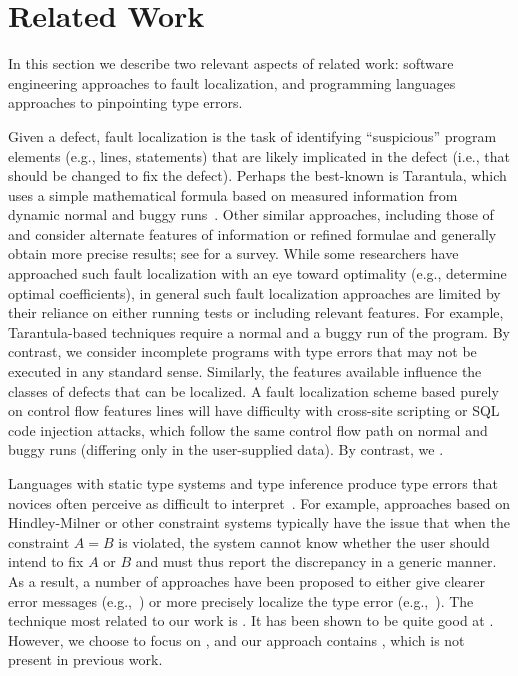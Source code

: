 \section{Related Work}
\label{sec:related-work}

In this section we describe two relevant aspects of related work:
software engineering approaches to fault localization, and 
programming languages approaches to pinpointing type errors. 

Given a defect, fault localization is the task of identifying
``suspicious'' program elements (e.g., lines, statements) that are likely
implicated in the defect (i.e., that should be changed to fix the defect).
Perhaps the best-known is Tarantula, which uses a simple mathematical
formula based on measured information from dynamic normal and buggy
runs~\citep{Jones2002-us}. Other similar approaches, including those of
\citet{Chen2002-qz} and \citet{Abreu2006-fn,Abreu2007-mu} consider alternate features
of information or refined formulae and generally obtain more precise
results; see \citet{Wong2009-pd} for a survey. While some researchers have
approached such fault localization with an eye toward optimality (e.g.,
\citet{Yoo2013-rw} determine optimal coefficients), in general
such fault localization approaches are limited by their reliance on either
running tests or including relevant features. For example, Tarantula-based
techniques require a normal and a buggy run of the program. By contrast,
we consider incomplete programs with type errors that may not be executed
in any standard sense. Similarly, the features available influence the
classes of defects that can be localized. A fault localization scheme based
purely on control flow features lines will have difficulty with cross-site
scripting or SQL code injection attacks, which follow the same control flow
path on normal and buggy runs (differing only in the user-supplied data).
By contrast, we .

Languages with static type systems and type inference produce type errors
that novices often perceive as difficult to
interpret~\citep{Wand1986-nw,Beaven1993-hb,Duggan1996-by,Yang2000-yr,McAdam1998-ub}.
For example, approaches based on Hindley-Milner or other constraint systems
typically have the issue that when the constraint $A=B$ is violated, 
the system cannot know whether the user should intend to fix $A$ or $B$ and
must thus report the discrepancy in a generic manner. As a result, a number
of approaches have been proposed to either give clearer error messages
(e.g.,~\cite{FIXME}) or more precisely localize the type error
(e.g.,~\cite{FIXME}). The technique most related to our work is .
It has been shown to be quite good at . However, we choose to
focus on , and our approach contains , which is not
present in previous work. 

